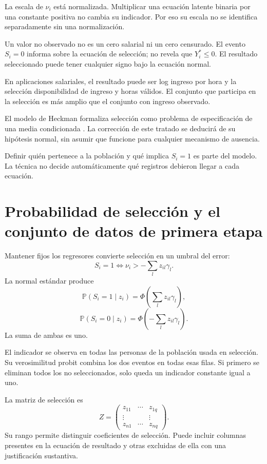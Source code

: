 \documentclass[11pt,a4paper]{article}
\newcommand{\Prob}{\mathbb P}
\begin{document}
La escala de \(\nu_i\) está normalizada.
Multiplicar una ecuación latente binaria
por una constante positiva no cambia
su indicador. Por eso su escala
no se identifica separadamente
sin una normalización.

Un valor no observado no es
un cero salarial ni un cero censurado.
El evento \(S_i=0\) informa
sobre la ecuación de selección;
no revela que \(Y_i^\ast\le0\).
El resultado seleccionado puede
tener cualquier signo bajo
la ecuación normal.

\begin{ejemplo}
En aplicaciones salariales, el resultado
puede ser log ingreso por hora
y la selección disponibilidad de
ingreso y horas válidos.
El conjunto que participa en
la selección es más amplio
que el conjunto con ingreso observado.
\end{ejemplo}
El modelo de Heckman formaliza
selección como problema de especificación
de una media condicionada \cite{heckman1979}.
La corrección de este tratado se
deducirá de su hipótesis normal,
sin asumir que funcione para
cualquier mecanismo de ausencia.

Definir quién pertenece a la
población y qué implica \(S_i=1\)
es parte del modelo.
La técnica no decide automáticamente
qué registros debieron llegar
a cada ecuación.

\clearpage
\section{Probabilidad de selección y el conjunto de datos de primera etapa}\label{unidad122}
Mantener fijos los regresores convierte
selección en un umbral del error:
\[
S_i=1\Longleftrightarrow
\nu_i>-\sum_lz_{il}\gamma_l.
\]
La normal estándar produce
\[
\Prob(S_i=1\mid z_i)
=\Phi\left(\sum_lz_{il}\gamma_l\right),
\]
\[
\Prob(S_i=0\mid z_i)
=\Phi\left(-\sum_lz_{il}\gamma_l\right).
\]
La suma de ambas es uno.

El indicador se observa en
todas las personas de la
población usada en selección.
Su verosimilitud probit combina
los dos eventos en todas esas filas.
Si primero se eliminan todos
los no seleccionados, solo queda
un indicador constante igual a uno.

La matriz de selección es
\[
Z=\begin{pmatrix}
z_{11}&\cdots&z_{1q}\\
\vdots&&\vdots\\
z_{n1}&\cdots&z_{nq}
\end{pmatrix}.
\]
Su rango permite distinguir
coeficientes de selección.
Puede incluir columnas presentes
en la ecuación de resultado
y otras excluidas de ella
con una justificación sustantiva.
\end{document}
